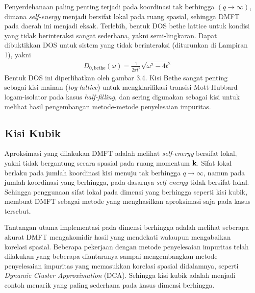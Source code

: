 Penyerdehanaan paling penting terjadi pada koordinasi tak berhingga $( q \rightarrow \infty )$, dimana \textit{self-energy} menjadi bersifat lokal pada ruang spasial, sehingga DMFT pada daerah ini menjadi eksak. Terlebih, bentuk DOS bethe lattice untuk kondisi yang tidak berinteraksi sangat sederhana, yakni semi-lingkaran. Dapat dibuktikkan DOS untuk sistem yang tidak berinteraksi (diturunkan di Lampiran 1), yakni
\begin{align}
D_{0,\text{bethe}}(\omega) = \frac{1}{2 \pi t^2} \sqrt{\omega^2 - 4t^2}
\end{align}
Bentuk DOS ini diperlihatkan oleh gambar 3.4. Kisi Bethe sangat penting sebagai kisi mainan (\textit{toy-lattice}) untuk mengklarifikasi transisi Mott-Hubbard logam-isolator pada kasus \textit{half-filling}, dan sering digunakan sebagai kisi untuk melihat hasil pengembangan metode-metode penyelesaian impuritas.

\subsection{Kisi Kubik}

Aproksimasi yang dilakukan DMFT adalah melihat \textit{self-energy} bersifat lokal, yakni tidak bergantung secara spasial pada ruang momentum $\textbf{k}$. Sifat lokal berlaku pada jumlah koordinasi kisi menuju tak berhingga $q \rightarrow \infty$, namun pada jumlah koordinasi yang berhingga, pada dasarnya \textit{self-energy} tidak bersifat lokal. Sehingga penggunaan sifat lokal pada dimensi yang berhingga seperti kisi kubik, membuat DMFT sebagai metode yang menghasilkan aproksimasi saja pada kasus tersebut.

Tantangan utama implementasi pada dimensi berhingga adalah melihat seberapa akurat DMFT mengakomidir hasil yang mendekati walaupun mengabaikan korelasi spasial. Beberapa pekerjaan dengan metode penyelesaian impuritas telah dilakukan\cite{staudt,kent,rohringer,daniel} yang beberapa diantaranya sampai mengembangkan metode penyelesaian impuritas yang memasukkan korelasi spasial didalamnya, seperti \textit{Dynamic Cluster Approximation} (DCA)\cite{dca}. Sehingga kisi kubik adalah menjadi contoh menarik yang paling sederhana pada kasus dimensi berhingga.

